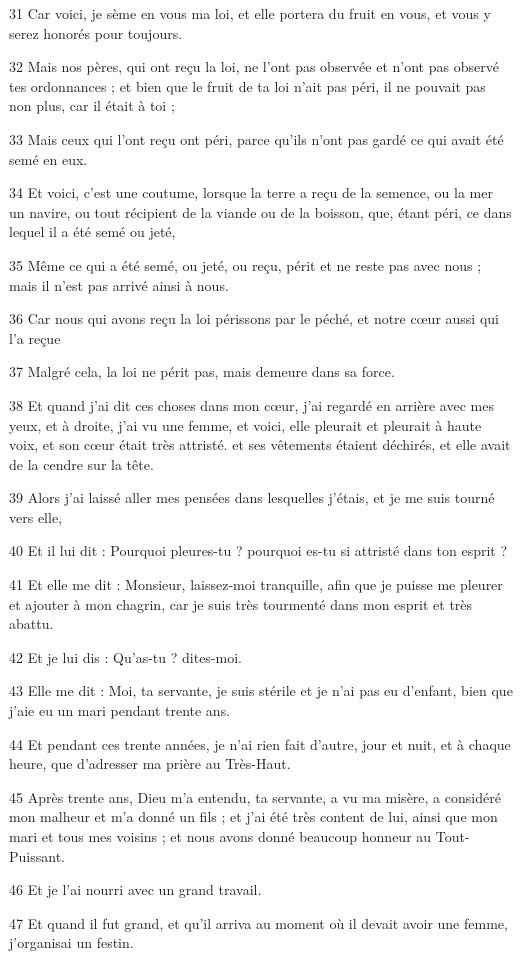 \par 31 Car voici, je sème en vous ma loi, et elle portera du fruit en vous, et vous y serez honorés pour toujours.
\par 32 Mais nos pères, qui ont reçu la loi, ne l'ont pas observée et n'ont pas observé tes ordonnances ; et bien que le fruit de ta loi n'ait pas péri, il ne pouvait pas non plus, car il était à toi ;
\par 33 Mais ceux qui l'ont reçu ont péri, parce qu'ils n'ont pas gardé ce qui avait été semé en eux.
\par 34 Et voici, c'est une coutume, lorsque la terre a reçu de la semence, ou la mer un navire, ou tout récipient de la viande ou de la boisson, que, étant péri, ce dans lequel il a été semé ou jeté,
\par 35 Même ce qui a été semé, ou jeté, ou reçu, périt et ne reste pas avec nous ; mais il n'est pas arrivé ainsi à nous.
\par 36 Car nous qui avons reçu la loi périssons par le péché, et notre cœur aussi qui l'a reçue
\par 37 Malgré cela, la loi ne périt pas, mais demeure dans sa force.
\par 38 Et quand j'ai dit ces choses dans mon cœur, j'ai regardé en arrière avec mes yeux, et à droite, j'ai vu une femme, et voici, elle pleurait et pleurait à haute voix, et son cœur était très attristé. et ses vêtements étaient déchirés, et elle avait de la cendre sur la tête.
\par 39 Alors j'ai laissé aller mes pensées dans lesquelles j'étais, et je me suis tourné vers elle,
\par 40 Et il lui dit : Pourquoi pleures-tu ? pourquoi es-tu si attristé dans ton esprit ?
\par 41 Et elle me dit : Monsieur, laissez-moi tranquille, afin que je puisse me pleurer et ajouter à mon chagrin, car je suis très tourmenté dans mon esprit et très abattu.
\par 42 Et je lui dis : Qu'as-tu ? dites-moi.
\par 43 Elle me dit : Moi, ta servante, je suis stérile et je n'ai pas eu d'enfant, bien que j'aie eu un mari pendant trente ans.
\par 44 Et pendant ces trente années, je n'ai rien fait d'autre, jour et nuit, et à chaque heure, que d'adresser ma prière au Très-Haut.
\par 45 Après trente ans, Dieu m'a entendu, ta servante, a vu ma misère, a considéré mon malheur et m'a donné un fils ; et j'ai été très content de lui, ainsi que mon mari et tous mes voisins ; et nous avons donné beaucoup honneur au Tout-Puissant.
\par 46 Et je l'ai nourri avec un grand travail.
\par 47 Et quand il fut grand, et qu'il arriva au moment où il devait avoir une femme, j'organisai un festin.

